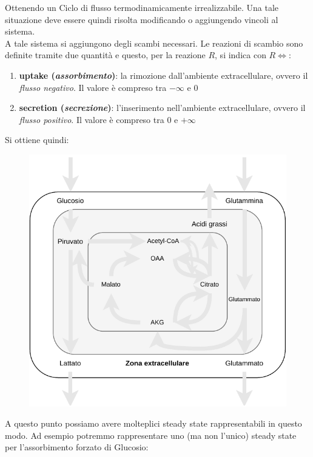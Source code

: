 \documentclass[a4paper,12pt, oneside]{book}
\begin{document}
Ottenendo un Ciclo di flusso termodinamicamente irrealizzabile.
Una tale situazione deve essere quindi risolta modificando o aggiungendo vincoli
al sistema.\\
A tale sistema si aggiungono degli scambi necessari. Le reazioni di scambio sono
definite tramite due quantità e questo, per la reazione $R$, si indica con
$R\iff$: 
\begin{enumerate}
  \item \textbf{uptake (\textit{assorbimento})}: la rimozione dall'ambiente
  extracellulare, ovvero il \textit{flusso negativo}. Il valore è compreso tra
  $-\infty$ e $0$ 
  \item \textbf{secretion (\textit{secrezione})}: l'inserimento nell'ambiente
  extracellulare, ovvero il \textit{flusso positivo}. Il valore è compreso tra
  $0$ e $+\infty$ 
\end{enumerate}
Si ottiene quindi:
\begin{figure}[H]
  \centering
  \includegraphics[scale = 0.8]{img/toy3.pdf}
\end{figure}
A questo punto possiamo avere molteplici steady state rappresentabili in questo
modo. Ad esempio potremmo rappresentare uno (ma non l'unico) steady state per
l'assorbimento forzato di Glucosio:
\end{document}
